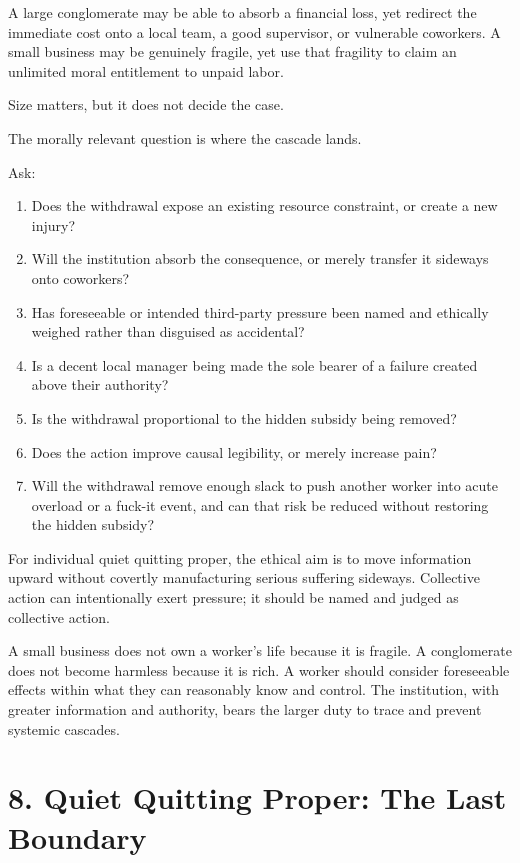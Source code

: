 \documentclass[11pt,oneside]{article}
\providecommand{\tightlist}{%
  \setlength{\itemsep}{0.22em}\setlength{\parskip}{0pt}}
\begin{document}
A large conglomerate may be able to absorb a financial loss, yet
redirect the immediate cost onto a local team, a good supervisor, or
vulnerable coworkers. A small business may be genuinely fragile, yet use
that fragility to claim an unlimited moral entitlement to unpaid labor.

Size matters, but it does not decide the case.

The morally relevant question is where the cascade lands.

Ask:

\begin{enumerate}
\def\labelenumi{\arabic{enumi}.}
\tightlist
\item
  Does the withdrawal expose an existing resource constraint, or create
  a new injury?
\item
  Will the institution absorb the consequence, or merely transfer it
  sideways onto coworkers?
\item
  Has foreseeable or intended third-party pressure been named and
  ethically weighed rather than disguised as accidental?
\item
  Is a decent local manager being made the sole bearer of a failure
  created above their authority?
\item
  Is the withdrawal proportional to the hidden subsidy being removed?
\item
  Does the action improve causal legibility, or merely increase pain?
\item
  Will the withdrawal remove enough slack to push another worker into
  acute overload or a fuck-it event, and can that risk be reduced
  without restoring the hidden subsidy?
\end{enumerate}

For individual quiet quitting proper, the ethical aim is to move
information upward without covertly manufacturing serious suffering
sideways. Collective action can intentionally exert pressure; it should
be named and judged as collective action.

A small business does not own a worker's life because it is fragile. A
conglomerate does not become harmless because it is rich. A worker
should consider foreseeable effects within what they can reasonably know
and control. The institution, with greater information and authority,
bears the larger duty to trace and prevent systemic cascades.

\hypertarget{quiet-quitting-proper-the-last-boundary}{%
\section{8. Quiet Quitting Proper: The Last
Boundary}\label{quiet-quitting-proper-the-last-boundary}}
\end{document}
